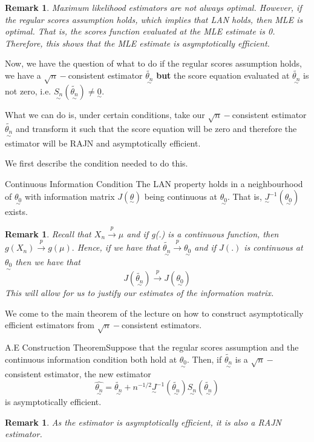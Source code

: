 \documentclass[twoside]{article}
\newtheorem{remark}[theorem]{Remark}
\newcommand{\utilde}{\underset{\sim}}
\begin{document}
\begin{remark}Maximum likelihood estimators are not always optimal. However, if the regular scores assumption holds, which implies that LAN holds, then MLE is optimal. That is, the scores function evaluated at the MLE estimate is 0. Therefore, this shows that the MLE estimate is asymptotically efficient.
\end{remark}

Now, we have the question of what to do if the regular scores assumption holds, we have a $\sqrt{n}-$consistent estimator $\tilde{\utilde{\theta_n}}$ \textbf{but} the score equation evaluated at $\tilde{\utilde{\theta_n}}$ is not zero, i.e. $
\utilde{S_n}(\tilde{\utilde{\theta_n}}) \neq \utilde{0}.
$

What we can do is, under certain conditions, take our $\sqrt{n}-$consistent estimator $\tilde{\utilde{\theta_n}}$ and transform it such that the score equation will be zero and therefore the estimator will be RAJN and asymptotically efficient.

We first describe the condition needed to do this.

\begin{proposition_exam}{Continuous Information Condition}{} The LAN property holds in a neighbourhood of $\utilde{\theta_0}$ with information matrix $J(\utilde{\theta})$ being continuous at $\utilde{\theta_0}.$ That is, $\utilde{J}^{-1}(\utilde{\theta_0})$ exists.
\end{proposition_exam}

\begin{remark} Recall that $X_n \xrightarrow{p} \mu$ and if g(.) is a continuous function, then $g(X_n) \xrightarrow{p} g(\mu).$ Hence, if we have that $\tilde{\utilde{\theta_n}} \xrightarrow{p} \utilde{\theta_0}$ and if $J(.)$ is continuous at $\utilde{\theta_0}$ then we have that 
$$
J(\tilde{\utilde{\theta_n}}) \xrightarrow{p} J(\utilde{\theta_0})
$$
 This will allow for us to justify our estimates of the information matrix.
\end{remark}

We come to the main theorem of the lecture on how to construct asymptotically efficient estimators from $\sqrt{n}-$consistent estimators.
\begin{theorem_exam}{A.E Construction Theorem}{}Suppose that the regular scores assumption and the continuous information condition both hold at $\utilde{\theta_0}.$ Then, if $\tilde{\utilde{\theta_n}}$ is a $\sqrt{n}-$consistent estimator, the new estimator 
$$
\hat{\utilde{\theta_n}} = \tilde{\utilde{\theta_n}} + n^{-1/2}\utilde{J}^{-1}(\tilde{\utilde{\theta_n}})\utilde{S_n}(\tilde{\utilde{\theta_n}})
$$
is asymptotically efficient.
\end{theorem_exam}
\begin{remark} As the estimator is asymptotically efficient, it is also a RAJN estimator.
\end{remark}
\end{document}
